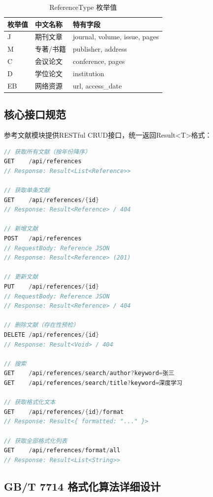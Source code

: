 \documentclass{../../softeng}
\begin{document}
\begin{table}[htbp]
\centering
\caption{ReferenceType 枚举值}
\label{tab:reftype}
\begin{tabular}{llp{8cm}}
\toprule
\textbf{枚举值} & \textbf{中文名称} & \textbf{特有字段} \\
\midrule
J  & 期刊文章 & journal, volume, issue, pages \\
M  & 专著/书籍 & publisher, address \\
C  & 会议论文 & conference, pages \\
D  & 学位论文 & institution \\
EB & 网络资源 & url, access\_date \\
\bottomrule
\end{tabular}
\end{table}

\subsection{核心接口规范}

参考文献模块提供RESTful CRUD接口，统一返回Result<T>格式：

\begin{lstlisting}[language=Java,caption={ReferenceController 核心接口}]
// 获取所有文献（按年份降序）
GET    /api/references
// Response: Result<List<Reference>>

// 获取单条文献
GET    /api/references/{id}
// Response: Result<Reference> / 404

// 新增文献
POST   /api/references
// RequestBody: Reference JSON
// Response: Result<Reference> (201)

// 更新文献
PUT    /api/references/{id}
// RequestBody: Reference JSON
// Response: Result<Reference> / 404

// 删除文献（存在性预检）
DELETE /api/references/{id}
// Response: Result<Void> / 404

// 搜索
GET    /api/references/search/author?keyword=张三
GET    /api/references/search/title?keyword=深度学习

// 获取格式化文本
GET    /api/references/{id}/format
// Response: Result<{ formatted: "..." }>

// 获取全部格式化列表
GET    /api/references/format/all
// Response: Result<List<String>>
\end{lstlisting}

\subsection{GB/T 7714 格式化算法详细设计}
\end{document}
